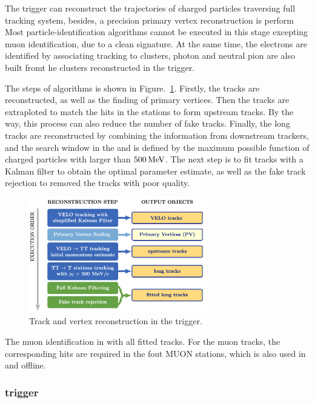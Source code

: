 The \hltone trigger can reconstruct the trajectories of charged particles traversing full \lhcb tracking system,
besides,
a precision primary vertex reconstruction is perform\supercite{Aaij_2019}
Most particle-identification algorithms cannot be executed in this stage excepting muon identification,
due to a clean signature.
At the same time,
the electrons are identified by associating tracking to \ecal clusters,
photon and neutral pion are also built fromt he clusters reconstructed in the \lone trigger.

The steps of \hltone algorithms is shown in Figure.~\ref{fig:Hltone}.
Firstly, 
the \velo tracks are reconstructed,
as well as the finding of primary vertices.
Then the \velo tracks are extraploted to match the hits in the \ttracker stations to form upstream tracks.
By the way, 
this process can also reduce the number of fake \velo tracks.
Finally, 
the long tracks are reconstructed by combining the information from downstream trackers,
and the search window in the \intr and \ot is defined by the maximum possible function of charged particles with \pt larger than $500\text{\,Me\kern -0.1em V}$.
The next step is to fit tracks with a Kalman filter to obtain the optimal parameter estimate,
as well as the fake track rejection to removed the tracks with poor quality.

\begin{figure}[!hbtp]
\centering
\includegraphics[width=0.69\textwidth]{Figures/02_Detector/Hltone}%
\caption{Track and vertex reconstruction in the \hltone trigger\supercite{Aaij_2019}.}
\label{fig:Hltone}
\end{figure}

The muon identification in \hltone with all fitted tracks.
For the muon tracks,
the corresponding hits are required in the fout MUON stations,
which is also used in \hlttwo and offline.


\subsubsection{\hlttwo trigger}


